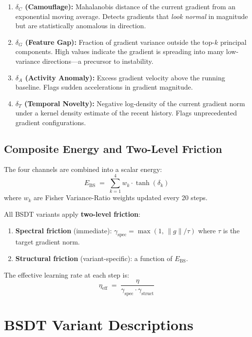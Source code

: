 \documentclass[11pt,a4paper]{article}
\begin{document}
\begin{enumerate}[nosep]
  \item \textbf{$\delta_C$ (Camouflage):} Mahalanobis distance of the current gradient from an exponential moving average.  Detects gradients that \emph{look normal} in magnitude but are statistically anomalous in direction.

  \item \textbf{$\delta_G$ (Feature Gap):} Fraction of gradient variance outside the top-$k$ principal components.  High values indicate the gradient is spreading into many low-variance directions---a precursor to instability.

  \item \textbf{$\delta_A$ (Activity Anomaly):} Excess gradient velocity above the running baseline.  Flags sudden accelerations in gradient magnitude.

  \item \textbf{$\delta_T$ (Temporal Novelty):} Negative log-density of the current gradient norm under a kernel density estimate of the recent history.  Flags unprecedented gradient configurations.
\end{enumerate}

\subsection{Composite Energy and Two-Level Friction}

The four channels are combined into a scalar energy:
\[
  E_{\mathrm{BS}} \;=\; \sum_{k=1}^{4} w_k \cdot \tanh(\delta_k)
\]
where $w_k$ are Fisher Variance-Ratio weights updated every 20 steps.

All BSDT variants apply \textbf{two-level friction}:
\begin{enumerate}[nosep]
  \item \textbf{Spectral friction} (immediate): $\gamma_{\mathrm{spec}} = \max(1, \, \|g\| / \tau)$ where $\tau$ is the target gradient norm.
  \item \textbf{Structural friction} (variant-specific): a function of $E_{\mathrm{BS}}$.
\end{enumerate}

The effective learning rate at each step is:
\[
  \eta_{\mathrm{eff}} \;=\; \frac{\eta}{\gamma_{\mathrm{spec}} \cdot \gamma_{\mathrm{struct}}}
\]

\section{BSDT Variant Descriptions}
\end{document}
